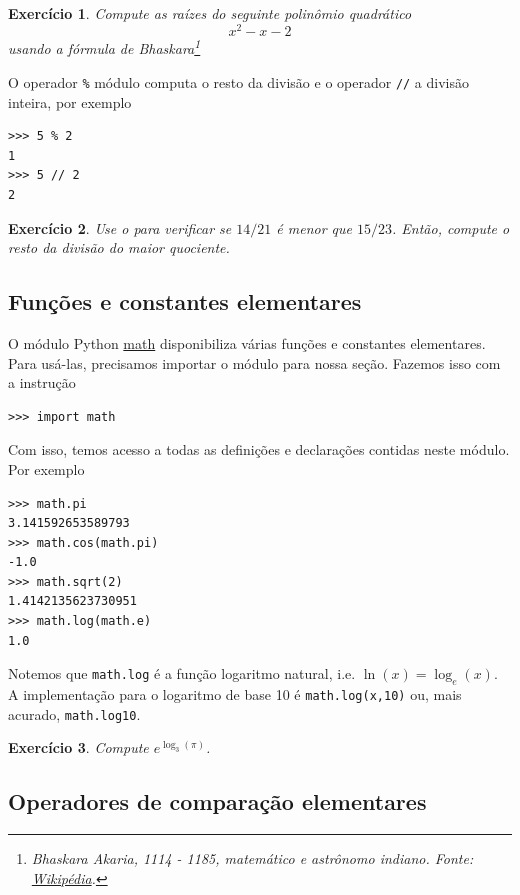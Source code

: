 \documentclass[12pt]{article}
\newtheorem{exr}{Exercício}[section]
\begin{document}
\begin{exr}
  Compute as raízes do seguinte polinômio quadrático
  \begin{equation}
    x^2 - x - 2
  \end{equation}
  usando a fórmula de Bhaskara\footnote{Bhaskara Akaria, 1114 - 1185, matemático e astrônomo indiano. Fonte: \href{https://pt.wikipedia.org/wiki/Bhaskara\_II}{Wikipédia}.}
\end{exr}

O operador \lstinline+%+ módulo computa o resto da divisão e o operador \lstinline+//+ a divisão inteira, por exemplo
\begin{lstlisting}
>>> 5 % 2
1
>>> 5 // 2
2
\end{lstlisting}

\begin{exr}
  Use o {\python} para verificar se $14/21$ é menor que $15/23$. Então, compute o resto da divisão do maior quociente.
\end{exr}

\subsection{Funções e constantes elementares}

O módulo Python \href{https://docs.python.org/3/library/math.html}{math} disponibiliza várias funções e constantes elementares. Para usá-las, precisamos importar o módulo para nossa seção. Fazemos isso com a instrução
\begin{lstlisting}
>>> import math
\end{lstlisting}
Com isso, temos acesso a todas as definições e declarações contidas neste módulo. Por exemplo
\begin{lstlisting}
>>> math.pi
3.141592653589793
>>> math.cos(math.pi)
-1.0
>>> math.sqrt(2)
1.4142135623730951
>>> math.log(math.e)
1.0
\end{lstlisting}

\begin{obs}
  Notemos que \lstinline+math.log+ é a função logaritmo natural, i.e. $\ln(x) = \log_e(x)$. A implementação {\python} para o logaritmo de base 10 é \lstinline+math.log(x,10)+ ou, mais acurado, \lstinline+math.log10+.
\end{obs}

\begin{exr}
  Compute $e^{\log_3(\pi)}$.
\end{exr}

\subsection{Operadores de comparação elementares}
\end{document}
